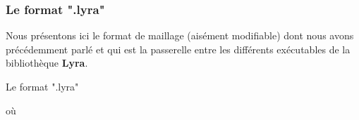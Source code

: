 \documentclass[a4paper,11pt]{article}
\begin{document}
\subsubsection{Le format ".lyra"} 
\noindent Nous présentons ici le format de maillage (aisément modifiable) dont nous avons précédemment parlé et qui est la passerelle entre les différents exécutables de la bibliothèque \textbf{Lyra}.

\begin{table}[H]
	\centering
	\caption{Le format ".lyra"}
\end{table}
\noindent où
\end{document}
